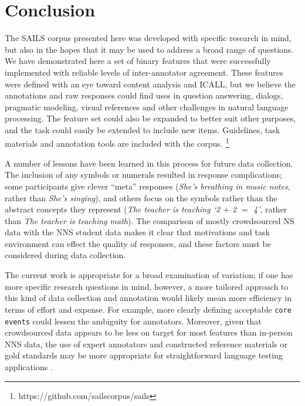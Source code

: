 \documentclass[11pt,a4paper]{article}
\newcommand{\feat}[1]{\texttt{#1}}
\newcommand{\md}[1]{\marginpar{\scriptsize MD: #1}}
\newcommand{\lk}[1]{\marginpar{\scriptsize LK: #1}}
\renewcommand{\marginpar}[1]{}
\begin{document}
\section{Conclusion}

The SAILS corpus presented here was developed with specific research in mind, but also in the hopes that it may be used to address a broad range of questions. We have demonstrated here a set of binary features that were successfully implemented with reliable levels of inter-annotator agreement. These features were defined with an eye toward content analysis and ICALL, but we believe the annotations and raw responses could find uses in question answering, dialogs, pragmatic modeling, visual references and other challenges in natural language processing. The feature set could also be expanded to better suit other purposes, and the task could easily be extended to include new items. Guidelines, task materials and annotation tools are included with the corpus. \footnote{https://github.com/sailscorpus/sails}

\smallskip
A number of lessons have been learned in this process for future data collection. The inclusion of any symbols or numerals resulted in response complications; some participants give clever ``meta'' responses (\textit{She's breathing in music notes}, rather than \textit{She's singing}), and others focus on the symbols rather than the abstract concepts they represent (\textit{The teacher is teaching `2 $+$ 2 $=$ 4'}, rather than \textit{The teacher is teaching math}). The comparison of mostly crowdsourced NS data with the NNS student data makes it clear that motivations and task environment can effect the quality of responses, and these factors must be considered during data collection.

\smallskip
The current work is appropriate for a broad examination of variation; if one has more specific research questions in mind, however, a more tailored approach to this kind of data collection and annotation would likely mean more efficiency in terms of effort and expense. For example, more clearly defining acceptable \feat{core events} could lessen the ambiguity for annotators. Moreover, given that crowdsourced data appears to be less on target for most features than in-person NNS data, the use of expert annotators and constructed reference materials or gold standards may be more appropriate for straightforward language testing applications \citep{somasundaran:chodorow:14}.
\end{document}

